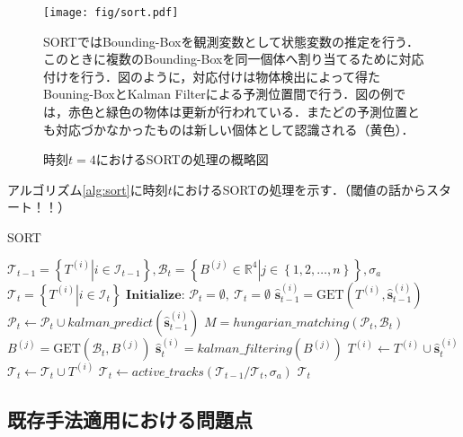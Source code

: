         \begin{figure}[t]
            \centering
            \texttt{[image: fig/sort.pdf]}
            \caption{時刻$t=4$におけるSORTの処理の概略図}
            \small
            SORTではBounding-Boxを観測変数として状態変数の推定を行う．このときに複数のBounding-Boxを同一個体へ割り当てるために対応付けを行う．図のように，対応付けは物体検出によって得たBouning-BoxとKalman Filterによる予測位置間で行う．図の例では，赤色と緑色の物体は更新が行われている．またどの予測位置とも対応づかなかったものは新しい個体として認識される（黄色）．
            \label{fig:sort}
        \end{figure}

        アルゴリズム\ref{alg:sort}に時刻$t$におけるSORTの処理を示す．（閾値の話からスタート！！）

        \begin{algorithm}[t]
            \caption{SORT}
            \label{alg:sort}
            \begin{algorithmic}[1]
                \REQUIRE $\mathcal{T}_{t-1} = \left\{ \left. T^{(i)}\right| i \in \mathcal{I}_{t-1}\right\} , \mathcal{B}_t = \left\{\left. B^{(j)} \in \mathbb{R}^{4}\right| j \in \left\{1,2,\dots,n\right\}\right\},\sigma_a$ 
                \ENSURE $\mathcal{T}_t = \left\{ \left. T^{(i)}\right| i \in \mathcal{I}_{t} \right\}$
                \STATE $\textbf{Initialize: } \mathcal{P}_t = \emptyset,\ \mathcal{T}_t = \emptyset$
                    \STATE $\hat{\bm{s}}_{t-1}^{(i)} = \text{GET}(T^{(i)},\hat{\bm{s}}_{t-1}^{(i)})$
                    \STATE $\mathcal{P}_t \leftarrow \mathcal{P}_t \cup kalman\_predict(\hat{\bm{s}}_{t-1}^{(i)})$
                \ENDFOR
                \STATE $M = hungarian\_matching(\mathcal{P}_t, \mathcal{B}_t)$
                    \STATE $B^{(j)} = \text{GET}(\mathcal{B}_t, B^{(j)})$
                    \STATE $\hat{\bm{s}}_t^{(i)} = kalman\_filtering(B^{(j)})$
                    \STATE $T^{(i)} \leftarrow T^{(i)} \cup \hat{\bm{s}}_t^{(i)}$
                    \STATE $\mathcal{T}_t \leftarrow \mathcal{T}_t \cup T^{(i)}$
                \ENDFOR
                \STATE $\mathcal{T}_t \leftarrow active\_tracks(\mathcal{T}_{t-1} / \mathcal{T}_t, \sigma_a)$
                \RETURN $\mathcal{T}_t$
            \end{algorithmic}
        \end{algorithm}

    \subsection{既存手法適用における問題点}



